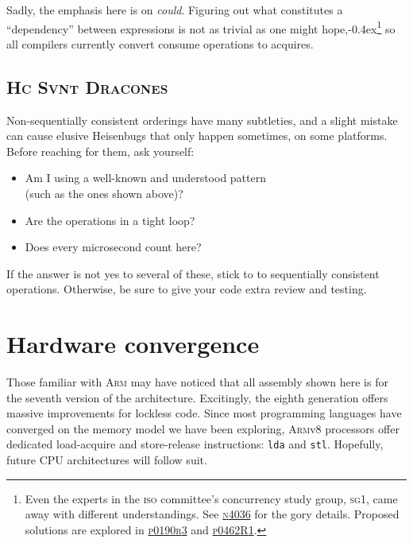 \documentclass[fontsize=10pt, oneside]{scrartcl}
\newcommand{\punckern}{\kern-0.4ex}
\newcommand{\monobox}[1]{\mbox{\texttt{#1}}}
\newcommand{\keyword}[1]{\monobox{\color{darkGreen}#1}}
\begin{document}
\setcounter{footnote}{0}
Sadly, the emphasis here is on \emph{could}.
Figuring out what constitutes a ``dependency'' between expressions is not as trivial as one might hope,\punckern\footnote{Even the experts in
the \textsc{iso} committee's concurrency study group, \textsc{sg}1,
came away with different understandings.
See
\href{https://www.open-std.org/jtc1/sc22/wg21/docs/papers/2014/n4036.pdf}{\textsc{n}4036}
for the gory details.
Proposed solutions are explored in
\href{https://www.open-std.org/jtc1/sc22/wg21/docs/papers/2017/p0190r3.pdf}{\textsc{p}0190\textsc{r}3}
and
\href{https://www.open-std.org/jtc1/sc22/wg21/docs/papers/2017/p0462r1.pdf}{\textsc{p}0462\textsc{R}1}.
}
so all compilers currently convert consume operations to acquires.

\subsection{\textsc{Hc Svnt Dracones}}

Non-sequentially consistent orderings have many subtleties,
and a slight mistake can cause elusive Heisenbugs that only happen sometimes,
on some platforms.
Before reaching for them, ask yourself:
\begin{itemize}[label={}, before=\itshape]
\item Am I using a well-known and understood pattern \\
      (such as the ones shown above)?
\item Are the operations in a tight loop?
\item Does every microsecond count here?
\end{itemize}
If the answer is not yes to several of these,
stick to to sequentially consistent operations.
Otherwise, be sure to give your code extra review and testing.

\section{Hardware convergence}

Those familiar with \textsc{Arm} may have noticed that all assembly shown here is for the seventh version of the architecture.
Excitingly, the eighth generation offers massive improvements for lockless code.
Since most programming languages have converged on the memory model we have been exploring,
\textsc{Arm}v8 processors offer dedicated load-acquire and store-release instructions: \keyword{lda} and \keyword{stl}.
Hopefully, future \textsc{CPU} architectures will follow suit.
\end{document}
